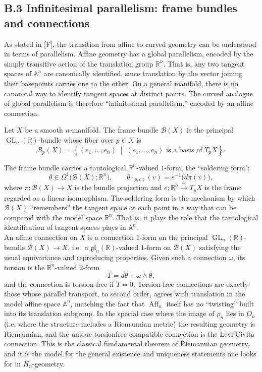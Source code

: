 \documentclass[a4paper,11pt]{article}
\begin{document}
\begin{appendices}
\subsection*{B.3 Infinitesimal parallelism: frame bundles and connections}

As stated in [F], the transition from affine to curved geometry can be understood in terms of parallelism. Affine geometry has a global parallelism, encoded by the simply
transitive action of the translation group $\mathbb{R}^n$. That is, any two tangent spaces of $\mathbb{A}^n$ are canonically identified, since translation by the vector joining their basepoints carries one to the other. On a general manifold, there is no canonical way to identify tangent spaces at distinct points. The curved analogue of global parallelism is therefore ``infinitesimal parallelism,'' encoded by an affine connection.

\begin{definition}
Let $X$ be a smooth $n$-manifold. The frame bundle $\mathcal{B}(X)$ is
the principal $\operatorname{GL}_n(\mathbb{R})$-bundle whose fiber over
$p\in X$ is
\[
\mathcal{B}_p(X)
=
\left\{
(e_1,\ldots,e_n)
\;\middle|\;
(e_1,\ldots,e_n)\text{ is a basis of }T_pX
\right\}.
\]
\end{definition}

The frame bundle carries a tautological $\mathbb{R}^n$-valued $1$-form, the ``soldering form":
\[
\theta \in \Omega^1\bigl(\mathcal{B}(X);\mathbb{R}^n\bigr), \qquad
\theta_{(p,e)}(v) = e^{-1}\bigl(d\pi(v)\bigr),
\]
where $\pi:\mathcal{B}(X)\to X$ is the bundle projection and $e:\mathbb{R}^n\xrightarrow{\ \sim\ }T_pX$ is the frame regarded as a linear isomorphism. The soldering form is the mechanism by which $\mathcal{B}(X)$ ``remembers'' the tangent space at each point in a way that can be compared with the model
space $\mathbb{R}^n$. That is, it plays the role that the tautological identification of tangent spaces plays in $\mathbb{A}^n$.\\

An affine connection on $X$ is a connection $1$-form on the principal
$\operatorname{GL}_n(\mathbb{R})$-bundle $\mathcal{B}(X)\to X$, i.e.\ a
$\mathfrak{gl}_n(\mathbb{R})$-valued $1$-form on $\mathcal B(X)$ satisfying
the usual equivariance and reproducing properties. Given such a connection $\omega$, its torsion is the $\mathbb{R}^n$-valued $2$-form
\[
T = d\theta + \omega\wedge\theta,
\]
and the connection is torsion-free if $T=0$. Torsion-free connections are exactly those whose parallel transport, to second order, agrees with translation in the model affine space $\mathbb{A}^n$, matching the fact that $\operatorname{Aff}_n$
itself has no ``twisting'' built into its translation subgroup. In the
special case where the image of $\rho_n$ lies in $O_n$ (i.e. where the structure includes a Riemannian metric) the resulting geometry is
Riemannian, and the unique torsionfree compatible connection is the Levi-Civita connection. This is the classical fundamental theorem of
Riemannian geometry, and it is the model for the general existence and
uniqueness statements one looks for in $H_n$-geometry.


\end{appendices}
\end{document}
